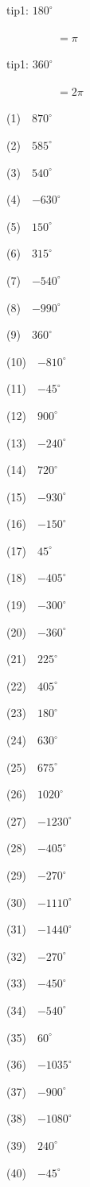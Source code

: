 \documentclass[a4j,twocolumn,10pt,fleqn,dvipdfmx]{jarticle}
\begin{document}
tip1: $180^\circ$

~~~~~~~~~$=\pi$


tip1: $360^\circ$

~~~~~~~~~$=2\pi$


(1)~~$870^\circ$

(2)~~$585^\circ$

(3)~~$540^\circ$

(4)~~$-630^\circ$

(5)~~$150^\circ$

(6)~~$315^\circ$

(7)~~$-540^\circ$

(8)~~$-990^\circ$

(9)~~$360^\circ$

(10)~~$-810^\circ$

(11)~~$-45^\circ$

(12)~~$900^\circ$

(13)~~$-240^\circ$

(14)~~$720^\circ$

(15)~~$-930^\circ$

(16)~~$-150^\circ$

(17)~~$45^\circ$

(18)~~$-405^\circ$

(19)~~$-300^\circ$

(20)~~$-360^\circ$

(21)~~$225^\circ$

(22)~~$405^\circ$

(23)~~$180^\circ$

(24)~~$630^\circ$

(25)~~$675^\circ$

(26)~~$1020^\circ$

(27)~~$-1230^\circ$

(28)~~$-405^\circ$

(29)~~$-270^\circ$

(30)~~$-1110^\circ$

(31)~~$-1440^\circ$

(32)~~$-270^\circ$

(33)~~$-450^\circ$

(34)~~$-540^\circ$

(35)~~$60^\circ$

(36)~~$-1035^\circ$

(37)~~$-900^\circ$

(38)~~$-1080^\circ$

(39)~~$240^\circ$

(40)~~$-45^\circ$
\end{document}
